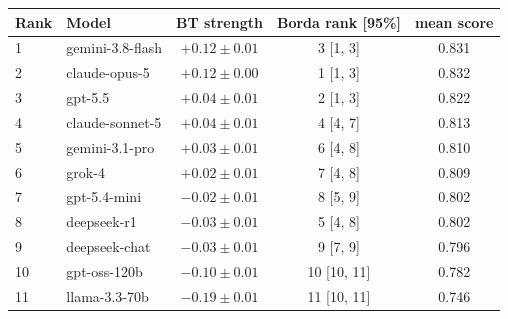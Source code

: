 \begin{tabular}{llccc}
\toprule
Rank & Model & BT strength & Borda rank [95\%] & mean score \\
\midrule
1 & gemini-3.8-flash & $+0.12 \pm 0.01$ & 3 [1, 3] & 0.831 \\
2 & claude-opus-5 & $+0.12 \pm 0.00$ & 1 [1, 3] & 0.832 \\
3 & gpt-5.5 & $+0.04 \pm 0.01$ & 2 [1, 3] & 0.822 \\
4 & claude-sonnet-5 & $+0.04 \pm 0.01$ & 4 [4, 7] & 0.813 \\
5 & gemini-3.1-pro & $+0.03 \pm 0.01$ & 6 [4, 8] & 0.810 \\
6 & grok-4 & $+0.02 \pm 0.01$ & 7 [4, 8] & 0.809 \\
7 & gpt-5.4-mini & $-0.02 \pm 0.01$ & 8 [5, 9] & 0.802 \\
8 & deepseek-r1 & $-0.03 \pm 0.01$ & 5 [4, 8] & 0.802 \\
9 & deepseek-chat & $-0.03 \pm 0.01$ & 9 [7, 9] & 0.796 \\
10 & gpt-oss-120b & $-0.10 \pm 0.01$ & 10 [10, 11] & 0.782 \\
11 & llama-3.3-70b & $-0.19 \pm 0.01$ & 11 [10, 11] & 0.746 \\
\bottomrule
\end{tabular}
